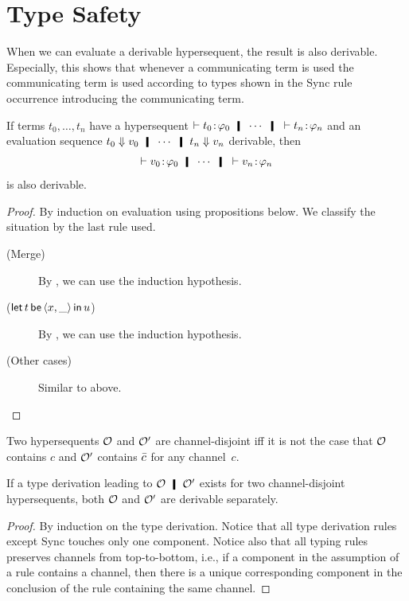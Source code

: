 \section{Type Safety}

When we can evaluate a derivable hypersequent,
the result is also derivable.
Especially, this shows that whenever a communicating term is used
the communicating term is used according to types
shown in the Sync rule occurrence introducing the communicating term.

 \begin{theorem}
  \label{safety}
  If terms $t_0,\ldots,t_n$ have a hypersequent
   $\tr \tj{t_0}{\phi_0} \hmid \cdots \hmid \tr \tj{t_n}{\phi_n}$ and
  an evaluation sequence $t_0\eval v_0\hmid \cdots \hmid t_n\eval v_n$
  derivable, then
  \[
   \tr\tj{v_0}{\phi_0} \hmid \cdots \hmid \tr \tj{v_n}{\phi_n}
  \]
  is also derivable.
 \end{theorem}
 \begin{proof}
  By induction on evaluation using propositions below.
  We classify the situation by the last rule used.
  \begin{description}
   \item[(Merge)]
	By , we can use the induction hypothesis.
   \item[($\mathsf{let }\,{t}\,\mathsf{ be }\,{\langle{x,\_}\rangle}\,\mathsf{ in }\,{u}$)]
	By , we can use the induction hypothesis.
   \item[(Other cases)]
	Similar to above.
  \end{description}
 \end{proof}

 Two hypersequents $\mathcal{O}$ and $\mathcal{O}'$ are channel-disjoint iff
 it is not the case that $\mathcal{O}$ contains $c$ and $\mathcal{O}'$ contains
 $\bar{c}$ for any channel~$c$.
 \begin{proposition}[Split]
  \label{split}
  If a type derivation leading to $\hypert\hmid \hypert'$ exists for two
  channel-disjoint
  hypersequents,
  both $\mathcal{O}$ and $\mathcal{O}'$ are derivable separately.
 \end{proposition}
 \begin{proof}
  By induction on the type derivation.  Notice that all type derivation
  rules except Sync touches only one component.  Notice also that all
  typing rules preserves channels from top-to-bottom, i.e., if a
  component in the assumption of a rule contains a channel, then there
  is a unique corresponding component in the conclusion of the rule
  containing the same channel.
 \end{proof}

